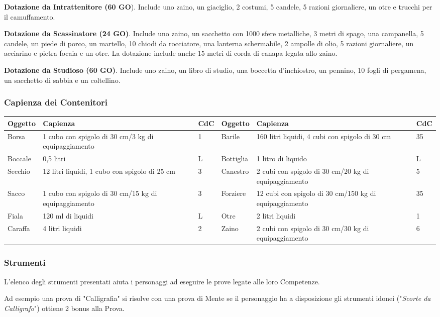 \documentclass[12pt,a4paper,twoside,openany]{book}
\begin{document}
\begin{multicols}{2}
\textbf{Dotazione da Intrattenitore (60 GO}). Include uno zaino, un giaciglio, 2 costumi, 5 candele, 5 razioni giornaliere, un otre e trucchi per il camuffamento.

\textbf{Dotazione da Scassinatore (24 GO)}. Include uno zaino, un sacchetto con 1000 sfere metalliche, 3 metri di spago, una campanella, 5 candele, un piede di porco, un martello, 10 chiodi da rocciatore, una lanterna schermabile, 2 ampolle di olio, 5 razioni giornaliere, un acciarino e pietra focaia e un otre. La dotazione include anche 15 metri di corda di canapa legata allo zaino.

\textbf{Dotazione da Studioso (60 GO)}. Include uno zaino, un libro di studio, una boccetta d'inchiostro, un pennino, 10 fogli di pergamena, un sacchetto di sabbia e un coltellino.


\end{multicols}

\subsubsection{Capienza dei Contenitori}

\begin{tabularx}{0.95\textwidth}{lXl|lXl}
\textbf{Oggetto}&\textbf{Capienza}&\textbf{CdC}&\textbf{Oggetto}&\textbf{Capienza}&\textbf{CdC}\\
\toprule
Borsa&1 cubo con spigolo di 30 cm/3 kg di equipaggiamento&1&Barile&160 litri liquidi, 4 cubi con spigolo di 30 cm&35\\
Boccale&0,5 litri&L&Bottiglia&1 litro di liquido&L\\
Secchio&12 litri liquidi, 1 cubo con spigolo di 25 cm&3&Canestro&2 cubi con spigolo di 30 cm/20 kg di equipaggiamento&5\\
Sacco&1 cubo con spigolo di 30 cm/15 kg di equipaggiamento&3&Forziere&12 cubi con spigolo di 30 cm/150 kg di equipaggiamento&35\\
Fiala&120 ml di liquidi&L&Otre&2 litri liquidi&1\\
Caraffa&4 litri liquidi&2&Zaino&2 cubi con spigolo di 30 cm/30 kg di equipaggiamento&6\\
\end{tabularx}


\begin{multicols}{2}

\subsubsection{Strumenti}

L'elenco degli strumenti presentati aiuta i personaggi ad eseguire le prove legate alle loro Competenze.

Ad esempio una prova di "Calligrafia" si risolve con una prova di Mente se il personaggio ha a disposizione gli strumenti idonei ("\textit{Scorte da Calligrafo}") ottiene 2 bonus alla Prova.

\end{multicols}
\end{document}
